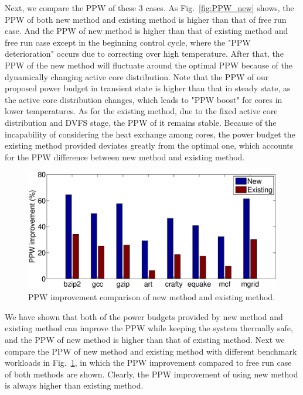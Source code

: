 Next, we compare the PPW of these $3$ cases. As Fig.~\ref{fig:PPW_new} shows, the PPW of both new method and existing method is higher than that of free run case. And the PPW of new method is higher than that of existing method and free run case except in the beginning control cycle, where the "PPW deterioration" occurs due to correcting over high temperature. After that, the PPW of the new method will fluctuate around the optimal PPW because of the dynamically changing active core distribution. Note that the PPW of our proposed power budget in transient state is higher than that in steady state, as the active core distribution changes, which leads to "PPW boost" for cores in lower temperatures. As for the existing method, due to the fixed active core distribution and DVFS stage, the PPW of it remains stable. Because of the incapability of considering the heat exchange among cores, the power budget the existing method provided deviates greatly from the optimal one, which accounts for the PPW difference between new method and existing method. 
\begin{figure}
\centering
\includegraphics[width=1\linewidth]{fig/transient_ppw.eps}
\caption{PPW improvement comparison of new method and existing method.}
\label{fig:transient_ppw_spec}
\end{figure}

We have shown that both of the power budgets provided by new method and existing method can improve the PPW while keeping the system thermally safe, and the PPW of new method is higher than that of existing method. Next we compare the PPW of new method and existing method with different benchmark workloads in 
Fig.~\ref{fig:transient_ppw_spec}, in which the PPW improvement compared to free run case of both methods are shown. Clearly, the PPW improvement of using new method is always higher than existing method.






